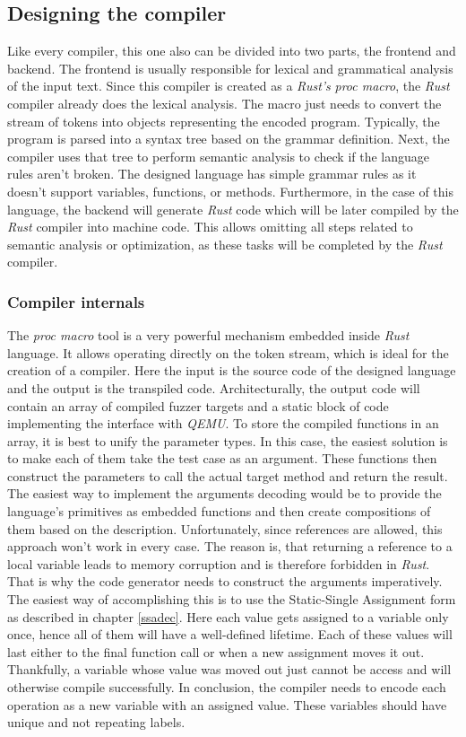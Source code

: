 \subsection{Designing the compiler} \label{sec:compiler}
Like every compiler, this one also can be divided into two parts, the frontend and backend. The frontend is usually responsible for lexical and grammatical analysis of the input text. Since this compiler is created as a \textit{Rust's} \textit{proc macro}, the \textit{Rust} compiler already does the lexical analysis. The macro just needs to convert the stream of tokens into objects representing the encoded program. Typically, the program is parsed into a syntax tree based on the grammar definition. Next, the compiler uses that tree to perform semantic analysis to check if the language rules aren't broken. The designed language has simple grammar rules as it doesn't support variables, functions, or methods. Furthermore, in the case of this language, the backend will generate \textit{Rust} code which will be later compiled by the \textit{Rust} compiler into machine code. This allows omitting all steps related to semantic analysis or optimization, as these tasks will be completed by the \textit{Rust} compiler. 

\subsubsection{Compiler internals}
The \textit{proc macro} tool is a very powerful mechanism embedded inside \textit{Rust} language. It allows operating directly on the token stream, which is ideal for the creation of a compiler. Here the input is the source code of the designed language and the output is the transpiled code. Architecturally, the output code will contain an array of compiled fuzzer targets and a static block of code implementing the interface with \textit{QEMU}. To store the compiled functions in an array, it is best to unify the parameter types. In this case, the easiest solution is to make each of them take the test case as an argument. These functions then construct the parameters to call the actual target method and return the result. The easiest way to implement the arguments decoding would be to provide the language's primitives as embedded functions and then create compositions of them based on the description. Unfortunately, since references are allowed, this approach won't work in every case. The reason is, that returning a reference to a local variable leads to memory corruption and is therefore forbidden in \textit{Rust}. That is why the code generator needs to construct the arguments imperatively. The easiest way of accomplishing this is to use the Static-Single Assignment form as described in chapter \ref{ssadec}. Here each value gets assigned to a variable only once, hence all of them will have a well-defined lifetime. Each of these values will last either to the final function call or when a new assignment moves it out. Thankfully, a variable whose value was moved out just cannot be access and will otherwise compile successfully. In conclusion, the compiler needs to encode each operation as a new variable with an assigned value. These variables should have unique and not repeating labels.

